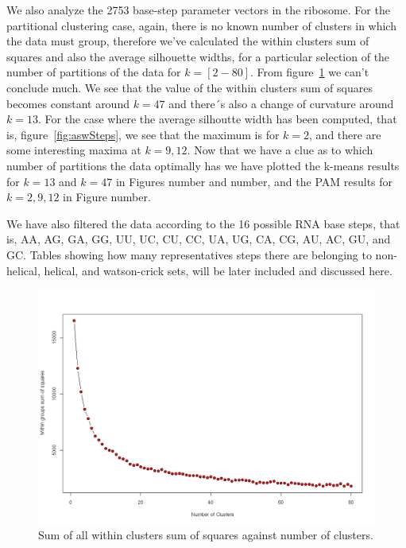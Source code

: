 We also analyze the 2753 base-step parameter vectors in the ribosome.
For the partitional clustering case,
again, there  is no known  number of clusters  in which the  data must
group, therefore  we've calculated the within clusters  sum of squares
and also the average silhouette  widths, for a particular selection of
the  number   of  partitions  of   the  data  for   $k=[2-80]$.   From
figure~\ref{fig:wssSteps}  we can't  conclude  much. We  see that  the
value of  the within clusters  sum of squares becomes  constant around
$k=47$ and there´s also a  change of curvature around $k=13$.  For the
case where  the average  silhoutte width has  been computed,  that is,
figure~\ref{fig:aswSteps}, we  see that the maximum is  for $k=2$, and
there are  some interesting  maxima at $k=9,12$.   Now that we  have a
clue as to  which number of partitions the data  optimally has we have
plotted the  k-means results for  $k=13$ and $k=47$ in  Figures number
and number, and the PAM results for $k=2, 9, 12$ in Figure number.

We have also  filtered the data according to the  16 possible RNA base
steps, that is,  AA, AG, GA, GG, UU,  UC, CU, CC, UA, UG,  CA, CG, AU,
AC, GU, and  GC.  Tables showing how many  representatives steps there
are belonging to non-helical,  helical, and watson-crick sets, will be
later included and discussed here.
\begin{figure}[htbp]
\centering
\includegraphics[angle=0, scale=0.40]{Chapter2/hartigan_nuclu_steps_b.png}
\caption{Sum of all within clusters sum of squares against number of clusters.}
\label{fig:wssSteps}
\end{figure}

